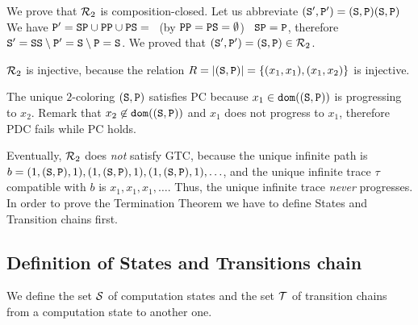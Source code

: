 \documentclass{lmcs}
\begin{document}
We prove that ${\mathcal R}_2$ is composition-closed.
Let us abbreviate $({\tt S}',{\tt P}') =({\tt S},{\tt P})({\tt S},{\tt P})$
We have 
$
{\tt P}' =
{\tt S}{\tt P} \cup {\tt P}{\tt P} \cup {\tt P}{\tt S} = 
$ \ (by ${\tt P}{\tt P} = {\tt P}{\tt S} = \emptyset$) \ $
{\tt S}{\tt P} = 
{\tt P}
$, therefore
${\tt S}' = {\tt S}{\tt S} \setminus {\tt P}' = {\tt S} \setminus {\tt P} = {\tt S}$.
We proved that
$
({\tt S}',{\tt P}') =
({\tt S},{\tt P}) \in {\mathcal R}_2
$.

${\mathcal R}_2$ is injective, because the relation 
$R = {| ({\tt S},{\tt P}) |} = \{(x_1,x_1), (x_1,x_2)\}$ is injective.

The unique $2$-coloring $({\tt S},{\tt P})$ satisfies PC 
because $x_1 \in {\tt dom}(({\tt S},{\tt P}))$
is progressing to  $x_2$. Remark that $x_2 \not \in {\tt dom}(({\tt S},{\tt P}))$
and $x_1$ does not progress to $x_1$, therefore PDC fails while PC holds. 

Eventually, ${\mathcal R}_2$ does \emph{not} satisfy GTC, because the unique infinite path is 
$b = (1,({\tt S},{\tt P}),1), (1,({\tt S},{\tt P}),1), (1,({\tt S},{\tt P}),1), \ldots$,
and the unique infinite trace $\tau$ compatible with $b$ is 
$x_1,x_1,x_1, \ldots$. 
Thus, the unique infinite trace \emph{never} progresses. 
\\






In order to prove the Termination Theorem we have to define States and
Transition chains first.


\subsection{Definition of States and Transitions chain}
\label{subsection-transition}

We define the set ${\mathcal S}$ of computation states and the set ${\mathcal T}$ of 
transition chains from a computation state to another one.
\end{document}

